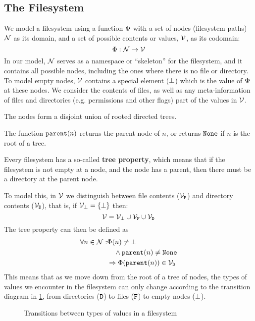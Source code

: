 
\subsection{The Filesystem}


We model a filesystem using a function $\Phi$ with a set of nodes (filesystem paths) $\mathcal{N}$ as its domain,
and a set of possible contents or values, $\mathcal{V}$, as its codomain:
\[ \Phi : \mathcal{N} \rightarrow \mathcal{V} \] 
In our model, $\mathcal{N}$ 
serves as a namespace or ``skeleton'' for the filesystem, and it
contains all possible nodes, including the ones where there is no file or directory.
To model empty nodes, $\mathcal{V}$ 
contains a special element ($\bot$) which is the value of $\Phi$ at these nodes.
We consider the contents of files, as well as any meta-information of files
and directories (e.g. permissions and other flags) part of the values in $\mathcal{V}$.


The nodes form a disjoint union of rooted directed trees.
\begin{mydef}
The function $\mathtt{parent}(n)$ returns the parent node of $n$, or
returns $\mathtt{None}$ if $n$ is the root of a tree.
\end{mydef}

Every filesystem has a so-called \textbf{tree property}, which means that
if the filesystem is not empty at a node, and the node has a parent,
then there must be a directory at the parent node.

To model this, in $\mathcal{V}$ we distinguish between 
file contents ($\mathcal{V}_{\mathtt{F}}$) and directory contents ($\mathcal{V}_{\mathtt{D}}$), that is,
if $\mathcal{V}_{\bot} = \{\bot\}$ then:
\[ \mathcal{V} = \mathcal{V}_{\bot} \cup \mathcal{V}_{\mathtt{F}} \cup \mathcal{V}_{\mathtt{D}} \]
The tree property can then be defined as
\begin{align*}
\forall n\in\setn: &\FS(n) \neq \empt \\ %
&\quad\wedge \parent(n) \neq \topnode \\
&\Rightarrow \FS(\parent(n)) \in \setd 
\end{align*}
This means that as we move down from the root of a tree of nodes,
the types of values we encounter in the filesystem can only change according to the
transition diagram in \cref{fig_transition}, from directories ($\mathtt{D}$) to files ($\mathtt{F}$)
to empty nodes ($\bot$).

\begin{figure}[htb]

\caption{Transitions between types of values in a filesystem}\label{fig_transition}
\end{figure}

